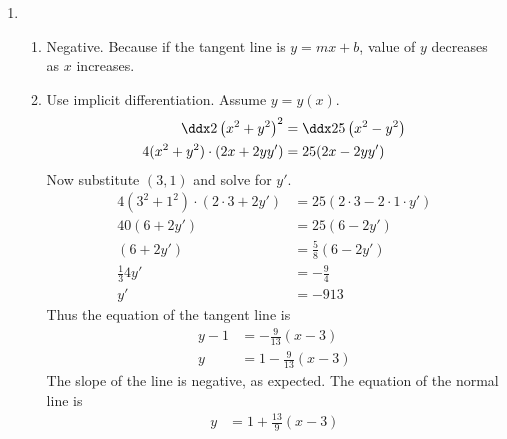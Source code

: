 \begin{enumerate}
    \item \begin{enumerate}
    	\item Negative. Because if the tangent line is $y=mx +b$, value of $y$ decreases as $x$ increases.
        \item Use implicit differentiation. Assume $y=y(x)$. 
        \begin{align*}
        	\ddx 2\left(x^2+y^2\right)^2&= \ddx 25\left(x^2-y^2\right) \\
        	4(x^2+y^2) \cdot (2x+ 2y y') &= 25(2x-2yy') 
        \end{align*}
        Now substitute $(3,1)$ and solve for $y'$. 
        \begin{align*}        
        	4(3^2+1^2) \cdot (2\cdot3+ 2 y') &= 25(2\cdot3-2\cdot1\cdot y')\\
        	40 (6+ 2 y') &= 25(6 - 2y')\\
             (6+ 2 y') &= \frac 5 8 (6 - 2y')\\
            \frac 13 4 y' &= - \frac 9 4 \\
            y' &= - 9 13
        \end{align*}
        Thus the equation of the tangent line is 
        \begin{align*}
        	y - 1 &= - \frac{9 }{13} (x - 3) \\
            y &= 1 - \frac{9}{ 13} (x - 3)
        \end{align*}
        The slope of the line is negative, as expected. The equation of the normal line is
        \begin{align*}
            y &= 1 + \frac{13}{ 9} (x - 3)
        \end{align*}       
    \end{enumerate}

    
\end{enumerate}    






